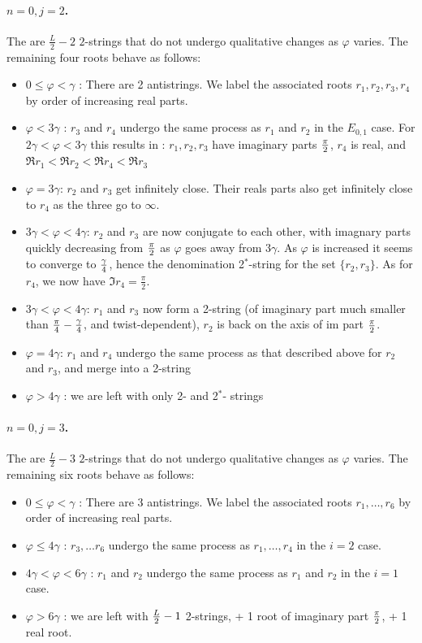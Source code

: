\documentclass[11pt]{article}
\begin{document}
\paragraph{$n=0, j=2$.}
The are $\frac{L}{2}-2$ $2$-strings that do not undergo qualitative changes as $\varphi$ varies. The remaining four roots behave as follows:
\begin{itemize}
 \item $0 \leq \varphi < \gamma$ : There are 2 antistrings. We label the associated roots $r_1, r_2, r_3, r_4$ by order of increasing real parts.
 \item $\varphi <3 \gamma$ : $r_3$ and $r_4$ undergo the same process as $r_1$ and $r_2$ in the $E_{0,1}$ case. 
 For $2\gamma < \varphi < 3 \gamma$ this results in : $r_1, r_2, r_3$ have imaginary parts ${\pi \over 2}$, $r_4$ is real, and $\Re r_1 < \Re r_2 < \Re r_4 < \Re r_3$
 \item $\varphi = 3\gamma$: $r_2$ and $r_3$ get infinitely close. Their reals parts also get infinitely close to $r_4$ as the three go to $\infty$.

  \item $3\gamma < \varphi < 4 \gamma$: $r_2$ and $r_3$ are now conjugate to each other, with imagnary parts quickly decreasing from $\pi \over 2$ as $\varphi$ goes away from $3 \gamma$. As $\varphi$ is increased it seems to converge to ${\gamma \over 4}$, hence the denomination 2$^{*}$-string for the set $\{r_2,r_3\}$. 
As for $r_4$, we now have $\Im r_4 = \frac{\pi}{2}$.
 
 \item $3\gamma < \varphi < 4 \gamma$: $r_1$ and $r_3$ now form a 2-string (of imaginary part much smaller than ${\pi \over 4}-{\gamma \over 4}$, and twist-dependent), $r_2$ is back on the axis of im part $\pi \over 2$.
 \item $\varphi = 4\gamma$: $r_1$ and $r_4$ undergo the same process as that described above for $r_2$ and $r_3$, and merge into a 2-string
 \item $\varphi > 4 \gamma$ : we are left with only 2- and 2$^{*}$- strings
\end{itemize}

\paragraph{$n=0, j=3$.}
The are $\frac{L}{2}-3$ $2$-strings that do not undergo qualitative changes as $\varphi$ varies. The remaining six roots behave as follows:
\begin{itemize}
 \item $0 \leq \varphi < \gamma$ : There are 3 antistrings. We label the associated roots $r_1,\ldots,r_6$ by order of increasing real parts.
 \item $\varphi \leq 4 \gamma$ : $r_3, \ldots r_6$ undergo the same process as $r_1, \ldots, r_4$ in the $i=2$ case.
 \item $4\gamma < \varphi <6 \gamma$ : $r_1$ and $r_2$ undergo the same process as $r_1$ and $r_2$ in the $i=1$ case.
 \item $\varphi > 6 \gamma$ : we are left with ${L\over 2} -1$ 2-strings, + 1 root of imaginary part $\pi \over 2$, + 1 real root.
\end{itemize}
\end{document}
